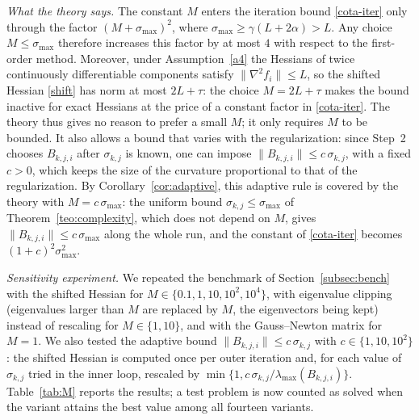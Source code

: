 \documentclass[11pt]{article}
\begin{document}
\emph{What the theory says.} The constant $M$ enters the iteration bound
\eqref{cota-iter} only through the factor $(M + \sigma_{\max})^2$, where
$\sigma_{\max} \geq \gamma(L + 2\alpha) > L$. Any choice $M \leq \sigma_{\max}$
therefore increases this factor by at most $4$ with respect to the first-order
method. Moreover, under Assumption~\ref{a4} the Hessians of twice
continuously differentiable components satisfy $\|\nabla^2 f_i\| \leq L$, so
the shifted Hessian \eqref{shift} has norm at most $2L + \tau$: the choice
$M = 2L + \tau$ makes the bound inactive for exact Hessians at the price of a
constant factor in \eqref{cota-iter}. The theory thus gives no reason to
prefer a small $M$; it only requires $M$ to be bounded. It also allows a bound
that varies with the regularization: since Step~2 chooses $B_{k,j,i}$ after
$\sigma_{k,j}$ is known, one can impose $\|B_{k,j,i}\| \leq c\,\sigma_{k,j}$,
with a fixed $c > 0$, which keeps the size of the curvature proportional to
that of the regularization. By Corollary~\ref{cor:adaptive}, this adaptive rule
is covered by the theory with $M = c\,\sigma_{\max}$: the uniform bound
$\sigma_{k,j} \leq \sigma_{\max}$ of Theorem~\ref{teo:complexity}, which does
not depend on $M$, gives $\|B_{k,j,i}\| \leq c\,\sigma_{\max}$ along the whole
run, and the constant of \eqref{cota-iter} becomes
$(1 + c)^2\sigma_{\max}^2$.

\emph{Sensitivity experiment.} We repeated the benchmark of
Section~\ref{subsec:bench} with the shifted Hessian for
$M \in \{0.1, 1, 10, 10^2, 10^4\}$, with eigenvalue clipping (eigenvalues larger
than $M$ are replaced by $M$, the eigenvectors being kept) instead of rescaling
for $M \in \{1, 10\}$, and with the Gauss--Newton matrix for $M = 1$. We also
tested the adaptive bound $\|B_{k,j,i}\| \le c\,\sigma_{k,j}$ with
$c \in \{1, 10, 10^2\}$: the shifted Hessian is computed once per outer
iteration and, for each value of $\sigma_{k,j}$ tried in the inner loop,
rescaled by $\min\{1, c\,\sigma_{k,j}/\lambda_{\max}(B_{k,j,i})\}$.
Table~\ref{tab:M} reports the results; a test problem is now counted as solved
when the variant attains the best value among all fourteen variants.
\end{document}
